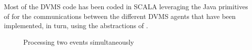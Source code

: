 Most of the DVMS code has been coded in SCALA leveraging the Java
primitives of \sg for the communications between the different DVMS
agents that have been implemented, in turn, using the abstractions of \vmps.

\begin{figure}[t]
\vspace*{-.2cm}
%
%
%
%
\vspace*{-.3cm}
\caption{Processing two events simultaneously\label{fig:dvms_pte}}
\vspace*{-.6cm}
\end{figure}




